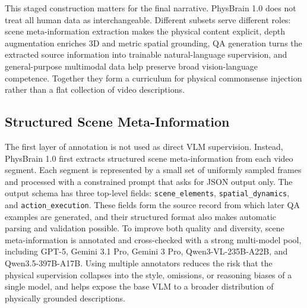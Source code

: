 \documentclass{llmxive}
\begin{document}
This staged construction matters for the final narrative. PhysBrain 1.0 does not treat all human data as interchangeable. Different subsets serve different roles: scene meta-information extraction makes the physical content explicit, depth augmentation enriches 3D and metric spatial grounding, QA generation turns the extracted source information into trainable natural-language supervision, and general-purpose multimodal data help preserve broad vision-language competence. Together they form a curriculum for physical commonsense injection rather than a flat collection of video descriptions.

\subsection{Structured Scene Meta-Information}

The first layer of annotation is not used as direct VLM supervision. Instead, PhysBrain 1.0 first extracts structured scene meta-information from each video segment. Each segment is represented by a small set of uniformly sampled frames and processed with a constrained prompt that asks for JSON output only. The output schema has three top-level fields: \texttt{scene\_elements}, \texttt{spatial\_dynamics}, and \texttt{action\_execution}. These fields form the source record from which later QA examples are generated, and their structured format also makes automatic parsing and validation possible. To improve both quality and diversity, scene meta-information is annotated and cross-checked with a strong multi-model pool, including GPT-5, Gemini 3.1 Pro, Gemini 3 Pro, Qwen3-VL-235B-A22B, and Qwen3.5-397B-A17B. Using multiple annotators reduces the risk that the physical supervision collapses into the style, omissions, or reasoning biases of a single model, and helps expose the base VLM to a broader distribution of physically grounded descriptions.
\end{document}

